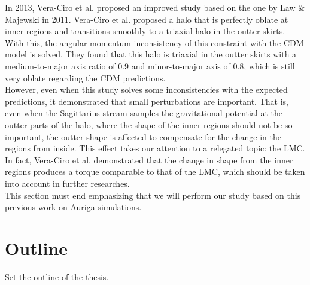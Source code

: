 In 2013, Vera-Ciro et al. proposed an improved study based on the one by Law \& Majewski in 2011. Vera-Ciro et al. proposed a halo that is perfectly oblate at inner regions and transitions smoothly to a triaxial halo in the outter-skirts. With this, the angular momentum inconsistency of this constraint with the CDM model is solved. They found that this halo is triaxial in the outter skirts with a medium-to-major axis ratio of $0.9$ and minor-to-major axis of $0.8$, which is still very oblate regarding the CDM predictions.\\

However, even when this study solves some inconsistencies with the expected predictions, it demonstrated that small perturbations are important. That is, even when the Sagittarius stream samples the gravitational potential at the outter parts of the halo, where the shape of the inner regions should not be so important, the outter shape is affected to compensate for the change in the regions from inside. This effect takes our attention to a relegated topic: the LMC. In fact, Vera-Ciro et al. demonstrated that the change in shape from the inner regions produces a torque comparable to that of the LMC, which should be taken into account in further researches.\\

%

This section must end emphasizing that we will perform our study based on this previous work on Auriga simulations.

\section{Outline}

Set the outline of the thesis.
